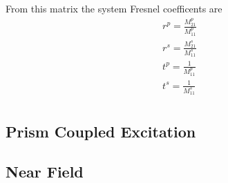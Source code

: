 From this matrix the system Fresnel coefficents are
\begin{align}
r^p = \frac{M^p_{21}}{M^p_{11}}\\
r^s = \frac{M^s_{21}}{M^s_{11}}\\
t^p = \frac{1}{M^p_{11}}\\
t^s = \frac{1}{M^s_{11}}\\
\end{align}

\subsection{Prism Coupled Excitation}

%
%

\subsection{Near Field}

%
%
